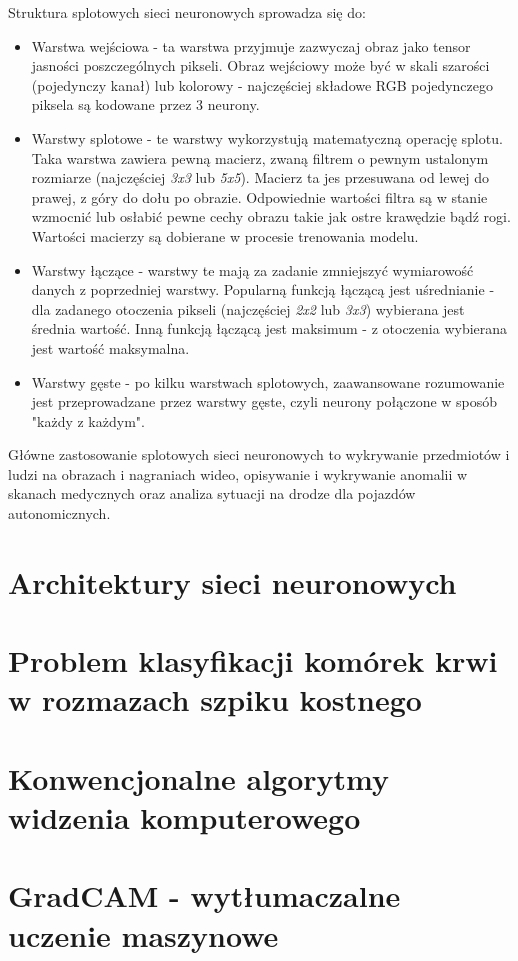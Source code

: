 Struktura splotowych sieci neuronowych sprowadza się do:
\begin{itemize}
    \item Warstwa wejściowa - ta warstwa przyjmuje zazwyczaj obraz jako tensor jasności poszczególnych pikseli.
    Obraz wejściowy może być w skali szarości (pojedynczy kanał) lub kolorowy - najczęściej składowe RGB pojedynczego piksela są kodowane przez 3 neurony.
    \item Warstwy splotowe - te warstwy wykorzystują matematyczną operację splotu.
    Taka warstwa zawiera pewną macierz, zwaną filtrem o pewnym ustalonym rozmiarze (najczęściej \textit{3x3} lub \textit{5x5}).
    Macierz ta jes przesuwana od lewej do prawej, z góry do dołu po obrazie.
    Odpowiednie wartości filtra są w stanie wzmocnić lub osłabić pewne cechy obrazu takie jak ostre krawędzie bądź rogi.
    Wartości macierzy są dobierane w procesie trenowania modelu.
    \item Warstwy łączące - warstwy te mają za zadanie zmniejszyć wymiarowość danych z poprzedniej warstwy.
    Popularną funkcją łączącą jest uśrednianie - dla zadanego otoczenia pikseli (najczęściej \textit{2x2} lub \textit{3x3}) wybierana jest średnia wartość.
    Inną funkcją łączącą jest maksimum - z otoczenia wybierana jest wartość maksymalna.
    \item Warstwy gęste - po kilku warstwach splotowych, zaawansowane rozumowanie jest przeprowadzane przez warstwy gęste, czyli neurony połączone w sposób "każdy z każdym".
\end{itemize}

Główne zastosowanie splotowych sieci neuronowych to wykrywanie przedmiotów i ludzi na obrazach i nagraniach wideo,
opisywanie i wykrywanie anomalii w skanach medycznych oraz analiza sytuacji na drodze dla pojazdów autonomicznych.

\section{Architektury sieci neuronowych}


\section{Problem klasyfikacji komórek krwi w rozmazach szpiku kostnego}


\section{Konwencjonalne algorytmy widzenia komputerowego}


\section{GradCAM - wytłumaczalne uczenie maszynowe}